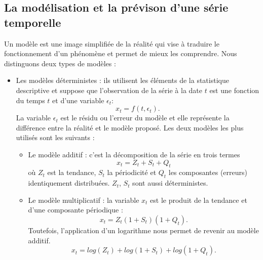 \subsection{La mod\'elisation et la pr\'evison d'une s\'erie temporelle}
Un mod\`ele est une image simplifi\'ee de la r\'ealit\'e qui vise \`a traduire le fonctionnement d'un ph\'enom\`ene et permet de mieux les comprendre.
Nous distinguons deux types de mod\`eles :
\begin{itemize}
	\item Les mod\`eles d\'eterministes : ils utilisent les \'el\'ements de la statistique descriptive et suppose que l'observation de la s\'erie \`a la date $t$ est une fonction du temps $t$ et d'une variable $\epsilon_t$: 
	$$x_t = f(t, \epsilon_{t}).$$ 
	La variable $\epsilon_t$ est le r\'esidu ou l'erreur du mod\`ele et elle repr\'esente la diff\'erence entre la r\'ealit\'e et le mod\`ele propos\'e. 
	\newline
	Les deux mod\`eles les plus utilis\'es sont les suivants :
	\begin{itemize}
		\item Le mod\`ele additif : c'est la d\'ecomposition de la s\'erie en trois termes
			$$x_t = Z_t + S_t + Q_t $$ o\`u $Z_t$ est la tendance, $S_t$ la p\'eriodicit\'e et $Q_t$ les composantes (erreurs) identiquement distribu\'ees. $Z_t$, $S_t$ sont aussi d\'eterministes.
		\item Le mod\`ele multiplicatif : la variable $x_t$  est le produit de la tendance et d'une composante p\'eriodique :
		$$x_t = Z_t(1 + S_t)(1 + Q_t).$$
		Toutefois, l'application d'un logarithme nous permet de revenir au mod\`ele additif.
		$$x_t = log(Z_t) +log(1 + S_t) + log(1 + Q_t).$$
	\end{itemize}


\end{itemize}
